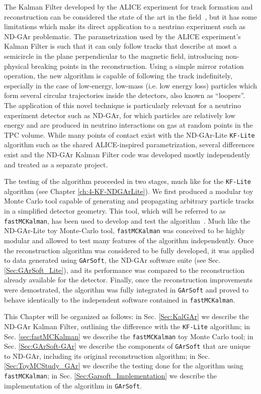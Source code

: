 The Kalman Filter developed by the ALICE experiment for track formation and reconstruction can be considered the state of the art in the field~\cite{Ivanov:2003yr, Arslandok:2022dyb}, but it has some limitations which make its direct application to a neutrino experiment such as ND-GAr problematic. The parametrization used by the ALICE experiment's Kalman Filter is such that it can only follow tracks that describe at most a semicircle in the plane perpendicular to the magnetic field, introducing non-physical breaking points in the reconstruction. Using a simple mirror rotation operation, the new algorithm is capable of following the track indefinitely, especially in the case of low-energy, low-mass (i.e. low energy loss) particles which form several circular trajectories inside the detectors, also known as ``loopers''. The application of this novel technique is particularly relevant for a neutrino experiment detector such as ND-GAr, for which particles are relatively low energy and are produced in neutrino interactions on gas at random points in the TPC volume. While many points of contact exist with the ND-GAr-Lite \texttt{KF-Lite} algorithm such as the shared ALICE-inspired parametrization, several differences exist and the ND-GAr Kalman Filter code was developed mostly independently and treated as a separate project.

The testing of the algorithm proceeded in two stages, much like for the \texttt{KF-Lite} algorithm (see Chapter \ref{ch:4-KF-NDGArLite}). We first produced a modular toy Monte Carlo tool capable of generating and propagating arbitrary particle tracks in a simplified detector geometry. This tool, which will be referred to as \texttt{fastMCKalman}, has been used to develop and test the algorithm~\cite{fastMCKalman}. Much like the ND-GAr-Lite toy Monte-Carlo tool, \texttt{fastMCKalman} was conceived to be highly modular and allowed to test many features of the algorithm independently. Once the reconstruction algorithm was considered to be fully developed, it was applied to data generated using \texttt{GArSoft}, the ND-GAr software suite (see Sec. \ref{Sec:GArSoft_Lite}), and its performance was compared to the reconstruction already available for the detector. Finally, once the reconstruction improvements were demostrated, the algorithm was fully integrated in \texttt{GArSoft} and proved to behave identically to the independent software contained in \texttt{fastMCKalman}.

This Chapter will be organized as follows: in Sec. \ref{Sec:KalGAr} we describe the ND-GAr Kalman Filter, outlining the difference with the \texttt{KF-Lite} algorithm; in Sec. \ref{sec:fastMCKalman} we describe the \texttt{fastMCKalman} toy Monte Carlo tool; in Sec. \ref{Sec:GArSoft-GAr} we describe the components of \texttt{GArSoft} that are unique to ND-GAr, including its original reconstruction algorithm; in Sec. \ref{Sec:ToyMCStudy_GAr} we describe the testing done for the algorithm using \texttt{fastMCKalman}; in Sec. \ref{Sec:Garsoft_Implementation} we describe the implementation of the algorithm in \texttt{GArSoft}.



